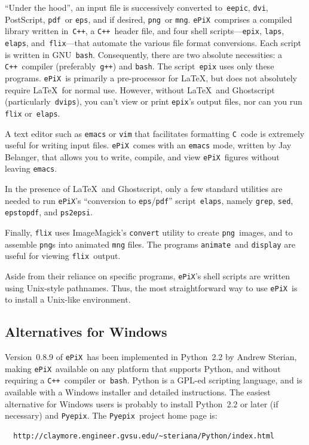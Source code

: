 \documentclass[12pt]{report}
\newcommand{\code}[1]{\texttt{#1}}
\newcommand{\ePiX}{\code{ePiX}}
\newcommand{\epix}{\code{epix}}
\newcommand{\C}{\code{C}}
\newcommand{\CXX}{\code{C++}}
\newcommand{\pyepix}{\code{Pyepix}}
\begin{document}
``Under the hood'', an input file is successively converted
to~\code{eepic}, \code{dvi}, PostScript, \code{pdf}~or \code{eps}, and
if desired, \code{png}~or \code{mng}.  \ePiX\ comprises a compiled
library written in~\CXX, a \CXX\ header file, and four shell
scripts---\epix, \code{laps}, \code{elaps}, and~\code{flix}---that
automate the various file format conversions.  Each script is written
in GNU~\code{bash}.  Consequently, there are two absolute necessities:
a \CXX\ compiler (preferably~\code{g++}) and \code{bash}. The
script~\code{epix} uses only these programs.  \ePiX\ is primarily a
pre-processor for \LaTeX, but does not absolutely require \LaTeX\ for
normal use. However, without \LaTeX~and Ghostscript
(particularly~\code{dvips}), you can't view or print \code{epix}'s
output files, nor can you run \code{flix} or~\code{elaps}.

A text editor such as \code{emacs} or \code{vim} that facilitates
formatting \C~code is extremely useful for writing input files. \ePiX\
comes with an \code{emacs} mode, written by Jay Belanger, that allows
you to write, compile, and view \ePiX\ figures without leaving
\code{emacs}. 

In the presence of \LaTeX~and Ghostscript, only a few standard
utilities are needed to run \ePiX's ``conversion to
\code{eps}/\code{pdf}'' script~\code{elaps}, namely \code{grep},
\code{sed}, \code{epstopdf}, and \code{ps2epsi}.

Finally, \code{flix} uses ImageMagick's \code{convert} utility to
create \code{png}~images, and to assemble \code{png}s into animated
\code{mng} files. The programs \code{animate}~and \code{display} are
useful for viewing \code{flix}~output.\index{Animation}

Aside from their reliance on specific programs, \ePiX's shell scripts
are written using Unix-style pathnames. Thus, the most straightforward
way to use \ePiX\ is to install a Unix-like environment.


\subsection*{Alternatives for Windows}

Version~0.8.9 of \ePiX\ has been implemented in Python~2.2 by Andrew
Sterian, making \ePiX\ available on any platform that supports Python,
and without requiring a \CXX~compiler or~\code{bash}.  Python is a
GPL-ed scripting language, and is available with a Windows installer
and detailed instructions.  The easiest alternative for Windows users
is probably to install Python~2.2 or later (if necessary) and
\code{Pyepix}. The \pyepix\ project home page is:
\begin{verbatim}
  http://claymore.engineer.gvsu.edu/~steriana/Python/index.html
\end{verbatim}
\end{document}
